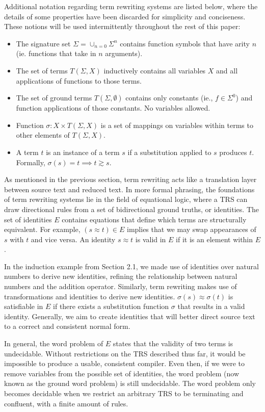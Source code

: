 \documentclass{article}
\begin{document}
Additional notation regarding term rewriting systems are listed below,
where the details of some properties have been discarded for simplicity and conciseness.
These notions will be used intermittently throughout the rest of this paper:
\begin{itemize}
    \item The signature set $\Sigma = \cup_{n=0}\Sigma^n$ contains function symbols that have arity $n$ (ie. functions that take in $n$ arguments).
    \item The set of terms $T(\Sigma, X)$ inductively contains all variables $X$ and all applications of functions to those terms.
    \item The set of ground terms $T(\Sigma, \emptyset)$ contains only constants (ie., $f \in \Sigma^0$) and function applications of those constants. No variables allowed.
    \item Function $\sigma: X \times T(\Sigma, X)$ is a set of mappings on variables within terms to other elements of $T(\Sigma, X)$.
    \item A term $t$ is an instance of a term $s$ if a substitution applied to $s$ produces $t$. Formally, $\sigma(s) = t \implies t \gtrsim s$.
\end{itemize}

As mentioned in the previous section, term rewriting acts like a translation layer between source text and reduced text.
In more formal phrasing, the foundations of term rewriting systems lie in the field of equational logic,
where a TRS can draw directional rules from a set of bidirectional ground truths, or identities. The set of identities $E$
contains equations that define which terms are structurally equivalent. For example, $(s \approx t) \in E$ implies that
we may swap appearances of $s$ with $t$ and vice versa. An identity $s \approx t$ is valid in $E$ if it is an element within $E$.

In the induction example from Section 2.1,
we made use of identities over natural numbers to derive new identities, refining the relationship between natural numbers and the addition operator.
Similarly, term rewriting makes use of transformations and identities to derive new identities. $\sigma(s) \approx \sigma(t)$ is satisfiable in $E$ if
there exists a substitution function $\sigma$ that results in a valid identity. Generally, we aim to create identities that will better direct source text
to a correct and consistent normal form.

In general, the word problem of $E$ states that the validity of two terms is undecidable.
Without restrictions on the TRS described thus far,
it would be impossible to produce a usable, consistent compiler.
Even then, if we were to remove variables from the possible set of identities,
the word problem (now known as the ground word problem) is still undecidable.
The word problem only becomes decidable when we restrict an arbitrary TRS to be terminating and confluent, with a finite amount of rules.
\end{document}
